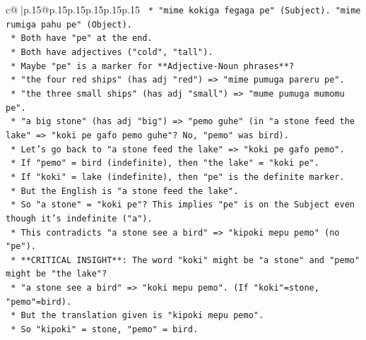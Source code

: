 \documentclass{article}
\begin{document}
{\begin{supertabular}{c@{$\;$}|p{.15\linewidth}@{}p{.15\linewidth}p{.15\linewidth}p{.15\linewidth}p{.15\linewidth}p{.15\linewidth}}
{{{\texttt{                                    *   "mime kokiga fegaga pe" (Subject). "mime rumiga pahu pe" (Object).} \\
\texttt{                                    *   Both have "pe" at the end.} \\
\texttt{                                    *   Both have adjectives ("cold", "tall").} \\
\texttt{                                    *   Maybe "pe" is a marker for **Adjective{-}Noun phrases**?} \\
\texttt{                                    *   "the four red ships" (has adj "red") => "mime pumuga pareru pe".} \\
\texttt{                                    *   "the three small ships" (has adj "small") => "mume pumuga mumomu pe".} \\
\texttt{                                    *   "a big stone" (has adj "big") => "pemo guhe" (in "a stone feed the lake" => "koki pe gafo pemo guhe"? No, "pemo" was bird).} \\
\texttt{                                    *   Let's go back to "a stone feed the lake" => "koki pe gafo pemo".} \\
\texttt{                                        *   If "pemo" = bird (indefinite), then "the lake" = "koki pe".} \\
\texttt{                                        *   If "koki" = lake (indefinite), then "pe" is the definite marker.} \\
\texttt{                                        *   But the English is "a stone feed the lake".} \\
\texttt{                                        *   So "a stone" = "koki pe"? This implies "pe" is on the Subject even though it's indefinite ("a").} \\
\texttt{                                        *   This contradicts "a stone see a bird" => "kipoki mepu pemo" (no "pe").} \\
\texttt{                                        *   **CRITICAL INSIGHT**: The word "koki" might be "a stone" and "pemo" might be "the lake"?} \\
\texttt{                                            *   "a stone see a bird" => "koki mepu pemo". (If "koki"=stone, "pemo"=bird).} \\
\texttt{                                            *   But the translation given is "kipoki mepu pemo".} \\
\texttt{                                            *   So "kipoki" = stone, "pemo" = bird.} \\
}}}
\end{supertabular}}
\end{document}
